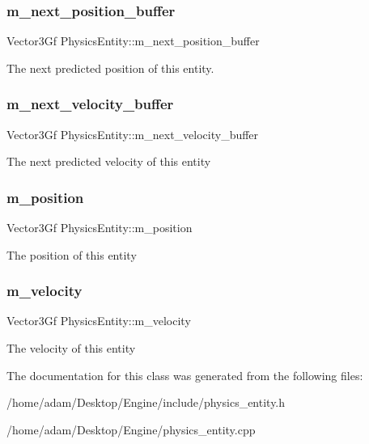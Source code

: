 \subsubsection{\texorpdfstring{m\+\_\+next\+\_\+position\+\_\+buffer}{m\_next\_position\_buffer}}
{\footnotesize\ttfamily Vector3\+Gf Physics\+Entity\+::m\+\_\+next\+\_\+position\+\_\+buffer\hspace{0.3cm}{\ttfamily [protected]}}

The next predicted position of this entity. \mbox{\label{classPhysicsEntity_a00034d95cc1a6f34ceaf5ad961e4afe6}} 
\subsubsection{\texorpdfstring{m\+\_\+next\+\_\+velocity\+\_\+buffer}{m\_next\_velocity\_buffer}}
{\footnotesize\ttfamily Vector3\+Gf Physics\+Entity\+::m\+\_\+next\+\_\+velocity\+\_\+buffer\hspace{0.3cm}{\ttfamily [protected]}}

The next predicted velocity of this entity \mbox{\label{classPhysicsEntity_afee5026bb0c5504697b7a6c4c59d8003}} 
\subsubsection{\texorpdfstring{m\+\_\+position}{m\_position}}
{\footnotesize\ttfamily Vector3\+Gf Physics\+Entity\+::m\+\_\+position\hspace{0.3cm}{\ttfamily [protected]}}

The position of this entity \mbox{\label{classPhysicsEntity_ad03f63872ec7c9ddf734e92034d6e112}} 
\subsubsection{\texorpdfstring{m\+\_\+velocity}{m\_velocity}}
{\footnotesize\ttfamily Vector3\+Gf Physics\+Entity\+::m\+\_\+velocity\hspace{0.3cm}{\ttfamily [protected]}}

The velocity of this entity 

The documentation for this class was generated from the following files\+:\begin{DoxyCompactItemize}
\item 
/home/adam/\+Desktop/\+Engine/include/physics\+\_\+entity.\+h\item 
/home/adam/\+Desktop/\+Engine/physics\+\_\+entity.\+cpp\end{DoxyCompactItemize}
